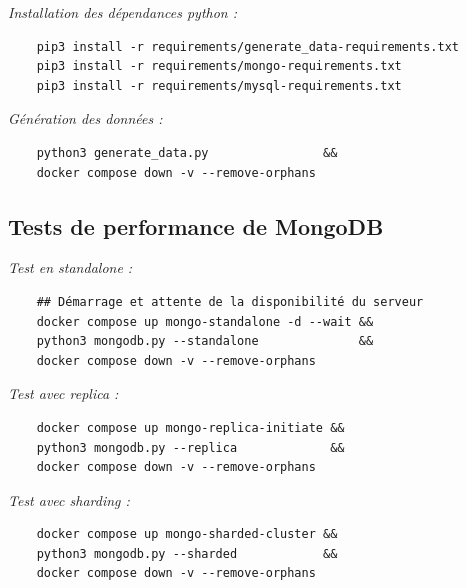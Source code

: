 \documentclass[12pt,a4paper]{report}
\begin{document}
\emph{Installation des dépendances python :}

\begin{card}
    \begin{verbatim}
    pip3 install -r requirements/generate_data-requirements.txt
    pip3 install -r requirements/mongo-requirements.txt
    pip3 install -r requirements/mysql-requirements.txt
\end{verbatim}
\end{card}

\emph{Génération des données :}

\begin{card}
    \begin{verbatim}
    python3 generate_data.py                &&
    docker compose down -v --remove-orphans 
\end{verbatim}
\end{card}

\subsection{Tests de performance de
MongoDB}

\emph{Test en standalone :}

\begin{card}
    \begin{verbatim}
    ## Démarrage et attente de la disponibilité du serveur
    docker compose up mongo-standalone -d --wait &&
    python3 mongodb.py --standalone              &&
    docker compose down -v --remove-orphans
\end{verbatim}
\end{card}

\emph{Test avec replica :}

\begin{card}
    \begin{verbatim}
    docker compose up mongo-replica-initiate &&
    python3 mongodb.py --replica             &&
    docker compose down -v --remove-orphans 
\end{verbatim}
\end{card}

\emph{Test avec sharding :}

\begin{card}
    \begin{verbatim}
    docker compose up mongo-sharded-cluster &&
    python3 mongodb.py --sharded            &&
    docker compose down -v --remove-orphans
\end{verbatim}
\end{card}
\end{document}
